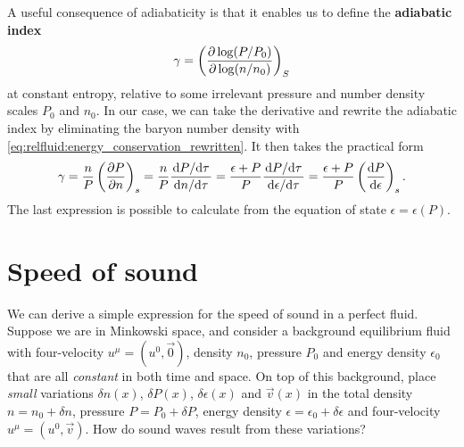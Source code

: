 A useful consequence of adiabaticity is that it enables us to define the \textbf{adiabatic index}
\begin{equation}
	\gamma = \left( \pdv{\log (P/P_0)}{\log (n/n_0)} \right)_S
\end{equation}
at constant entropy, relative to some irrelevant pressure and number density scales $P_0$ and $n_0$.
In our case, we can take the derivative and rewrite the adiabatic index by eliminating the baryon number density with \cref{eq:relfluid:energy_conservation_rewritten}.
It then takes the practical form
\begin{equation}
	\gamma = \frac{n}{P} \left( \pdv{P}{n} \right)_s
	       = \frac{n}{P} \frac{\odv{P}/{\tau}}{\odv{n}/{\tau}}
	       = \frac{\epsilon+P}{P} \frac{\odv{P}/{\tau}}{\odv{\epsilon}/{\tau}}
	       = \frac{\epsilon+P}{P} \left( \odv{P}{\epsilon} \right)_s .
\label{eq:relfluid:adiabadicity}
\end{equation}
The last expression is possible to calculate from the equation of state $\epsilon = \epsilon(P)$.

\section{Speed of sound}
\label{sec:relfluid:sound}

We can derive a simple expression for the speed of sound in a perfect fluid.
Suppose we are in Minkowski space, and consider a background equilibrium fluid with four-velocity $u^\mu = (u^0, \vec{0})$, density $n_0$, pressure $P_0$ and energy density $\epsilon_0$ that are all \emph{constant} in both time and space.
On top of this background, place \emph{small} variations $\delta n(x)$, $\delta P(x)$, $\delta \epsilon(x)$ and $\vec{v}(x)$ in the total density $n = n_0 + \delta n$, pressure $P = P_0 + \delta P$, energy density $\epsilon = \epsilon_0 + \delta \epsilon$ and four-velocity $u^\mu = (u^0, \vec{v})$.
How do sound waves result from these variations?

